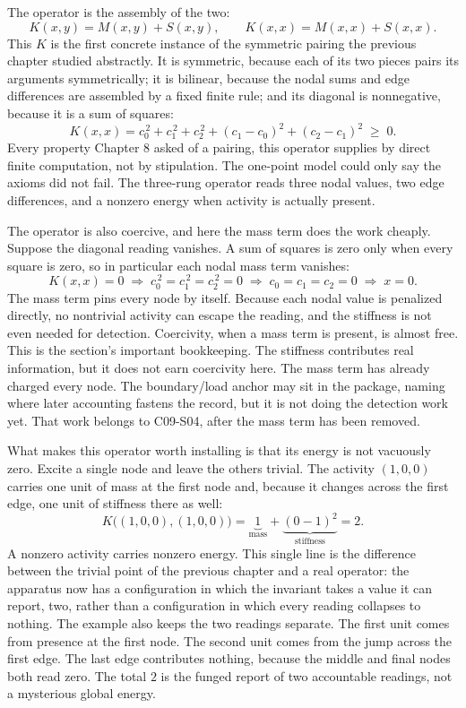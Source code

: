 The operator is the assembly of the two:
\[
  K(x,y) = M(x,y) + S(x,y),
  \qquad
  K(x,x) = M(x,x) + S(x,x).
\]
This \(K\) is the first concrete instance of the symmetric pairing the previous
chapter studied abstractly. It is symmetric, because each of its two pieces pairs
its arguments symmetrically; it is bilinear, because the nodal sums and edge
differences are assembled by a fixed finite rule; and its diagonal is
nonnegative, because it is a sum of squares:
\[
  K(x,x) = c_0^{\,2} + c_1^{\,2} + c_2^{\,2}
           + (c_1 - c_0)^{2} + (c_2 - c_1)^{2}
         \;\ge\; 0.
\]
Every property Chapter 8 asked of a pairing, this operator supplies by direct
finite computation, not by stipulation. The one-point model could only say the
axioms did not fail. The three-rung operator reads three nodal values, two edge
differences, and a nonzero energy when activity is actually present.

The operator is also coercive, and here the mass term does the work cheaply.
Suppose the diagonal reading vanishes. A sum of squares is zero only when every
square is zero, so in particular each nodal mass term vanishes:
\[
  K(x,x) = 0
  \;\Longrightarrow\;
  c_0^{\,2} = c_1^{\,2} = c_2^{\,2} = 0
  \;\Longrightarrow\;
  c_0 = c_1 = c_2 = 0
  \;\Longrightarrow\;
  x = 0.
\]
The mass term pins every node by itself. Because each nodal value is penalized
directly, no nontrivial activity can escape the reading, and the stiffness is not
even needed for detection. Coercivity, when a mass term is present, is almost
free.
This is the section's important bookkeeping. The stiffness contributes real
information, but it does not earn coercivity here. The mass term has already
charged every node. The boundary/load anchor may sit in the package, naming where
later accounting fastens the record, but it is not doing the detection work yet.
That work belongs to C09-S04, after the mass term has been removed.

What makes this operator worth installing is that its energy is not vacuously
zero. Excite a single node and leave the others trivial. The activity
\((1,0,0)\) carries one unit of mass at the first node and, because it changes
across the first edge, one unit of stiffness there as well:
\[
  K\big((1,0,0),(1,0,0)\big)
  = \underbrace{1}_{\text{mass}} + \underbrace{(0-1)^2}_{\text{stiffness}}
  = 2.
\]
A nonzero activity carries nonzero energy. This single line is the difference
between the trivial point of the previous chapter and a real operator: the
apparatus now has a configuration in which the invariant takes a value it can
report, two, rather than a configuration in which every reading collapses to
nothing.
The example also keeps the two readings separate. The first unit comes from
presence at the first node. The second unit comes from the jump across the first
edge. The last edge contributes nothing, because the middle and final nodes both
read zero. The total \(2\) is the funged report of two accountable readings, not
a mysterious global energy.


